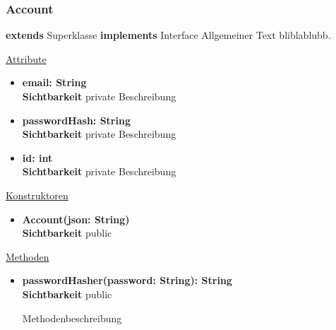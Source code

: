 \subsubsection{Account} \label{service:klasse:Account}
\textbf{extends} Superklasse \newline
\textbf{implements} Interface \newline
Allgemeiner Text bliblablubb. \newline

\underline{Attribute}
\begin{itemize}
\itemsep0pt
\item \textbf{email: String} \hfill\\ 
\textbf{Sichtbarkeit} private 
Beschreibung

\item \textbf{passwordHash: String} \hfill\\ 
\textbf{Sichtbarkeit} private 
Beschreibung

\item \textbf{id: int} \hfill\\ 
\textbf{Sichtbarkeit} private  
Beschreibung
\end{itemize}

\underline{Konstruktoren}
\begin{itemize}
\itemsep0pt
\item \textbf{Account(json: String)} \hfill\\
\textbf{Sichtbarkeit} public
\end{itemize}

\underline{Methoden}
\begin{itemize}
\itemsep0pt
\item \textbf{passwordHasher(password: String): String}\hfill\\
\textbf{Sichtbarkeit} public

Methodenbeschreibung

\end{itemize}